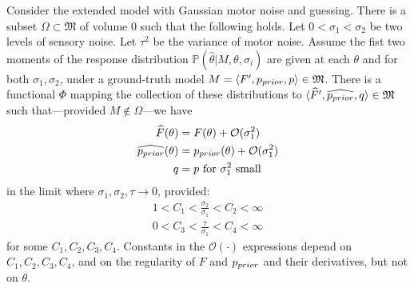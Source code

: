\begin{thm}
Consider the extended model with Gaussian motor noise and guessing.
There is a subset $\Omega \subset \mathfrak{M}$ of volume $0$ such that the following holds.
Let $0 < \sigma_1 < \sigma_2$ be two levels of sensory noise. Let $\tau^2$ be the variance of motor noise.
Assume the fist two moments of the response distribution $\mathbb{P}(\widehat{\theta}|M,\theta, \sigma_i)$ are given at each $\theta$ and for both $\sigma_1, \sigma_2$, under a ground-truth model $M = \langle F', p_{prior},p \rangle \in \mathfrak{M}$.
There is a functional $\Phi$ mapping the collection of these distributions to $\langle \widehat{F}', \widehat{p_{prior}},q \rangle \in \mathfrak{M}$
such that---provided $M \not\in \Omega$---we have
\begin{align*}
    \widehat{F}(\theta) &= F(\theta) + \mathcal{O}(\sigma_1^2) \\
    \widehat{p_{prior}}(\theta) &= p_{prior}(\theta) + \mathcal{O}(\sigma_1^2) \\
    q &= p  \text{ for $\sigma_1^2$ small}
\end{align*}
in the limit where $\sigma_1, \sigma_2, \tau \rightarrow 0$, provided: 
\begin{align*}
1 < C_1 < \frac{\sigma_2}{\sigma_1} < C_2 < \infty     \\
0 < C_3 < \frac{\tau}{\sigma_1} < C_4 < \infty
\end{align*}
for some $C_1, C_2, C_3, C_4$.
Constants in the $\mathcal{O}(\cdot)$ expressions depend on $C_1, C_2, C_3, C_4$, and on the regularity of $F$ and $p_{prior}$ and their derivatives, but not on $\theta$.
\end{thm}



